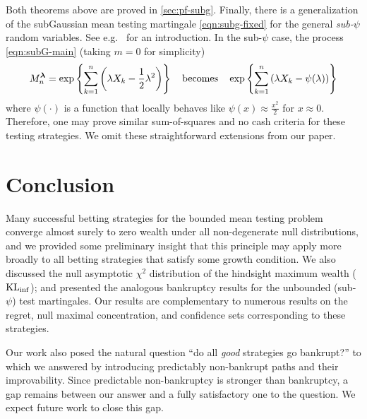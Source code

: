 Both theorems above are proved in \cref{sec:pf-subg}.
Finally, there is a generalization of the subGaussian mean testing martingale \eqref{eqn:subg-fixed} for the general \emph{sub-$\psi$} random variables. See e.g.\ \cite{howard2020time,howard2021time} for an introduction. In the sub-$\psi$ case, the process \eqref{eqn:subG-main} (taking $m=0$ for simplicity)
\begin{equation}
         M_n^{\boldsymbol{\lambda}} = \exp\left\{ \sum_{k=1}^n \left(\lambda X_k - \frac{1}{2}\lambda^2 \right)  \right\} \quad \text{becomes} \quad
    \exp\left\{    \sum_{k=1}^n \left( \lambda X_k -\psi(\lambda)\right)\right\}
\end{equation}
where $\psi(\cdot)$ is a function that locally behaves like $\psi(x) \approx \frac{x^2}{2}$ for $x\approx 0$. Therefore, one may prove similar sum-of-squares and no cash criteria for these testing strategies. We omit these straightforward extensions from our paper.


\section{Conclusion}

Many successful betting strategies for the bounded mean testing problem converge almost surely to zero wealth under all non-degenerate null distributions, and we provided some preliminary insight that this principle may apply more broadly to all betting strategies that satisfy some growth condition.
We also discussed the null asymptotic $\chi^2$ distribution of the hindsight maximum wealth ($\operatorname{KL}_{\inf}$); and presented the analogous bankruptcy results for the unbounded (sub-$\psi$) test martingales.
Our results are complementary to numerous results on the regret, null maximal concentration, and confidence sets corresponding to these strategies.


Our work also posed the natural question ``do all \emph{good} strategies go bankrupt?'' to which we answered by introducing predictably non-bankrupt paths and their improvability. Since predictable non-bankruptcy is stronger than bankruptcy, a gap remains between our answer and a fully satisfactory one to the question. We expect future work to close this gap.


